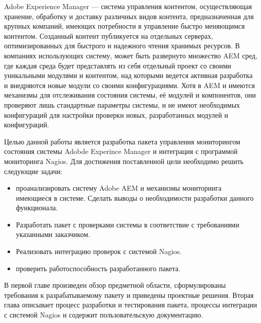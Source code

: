 \Introduction

Adobe Experience Manager — система управления контентом, осуществляющая хранение, обработку и доставку различных видов контента, предназначенная для крупных компаний, имеющих потребности в управление быстро меняющимся контентом. Созданный контент публикуется на отдельных серверах, оптимизированных для быстрого и надежного чтения хранимых ресурсов. В компаниях использующих систему, может быть развернуто множество AEM сред, где каждая среда будет представлять из себя отдельный проект со своими уникальными модулями и контентом, над которыми ведется активная разработка и внедряются новые модули со своими конфигурациями. Хотя в AEM и имеются механизмы для отслеживания состояния системы, её модулей и компонентов, они проверяют лишь стандартные параметры системы, и не имеют необходимых конфигураций для настройки проверки новых, разработанных модулей и конфигураций.

Целью данной работы является разработка пакета управления мониторингом состояния системы Adobde Experince Manager и интеграция с программой мониторинга Nagios. Для достижения поставленной цели необходимо решить следующие задачи:

\begin{itemize}
\item проанализировать систему Adobe AEM и механизмы мониторинга имеющиеся в системе. Сделать выводы о необходимости разработки данного функционала.
\item Разработать пакет с проверками системы в соответствие с требованиями указанными заказчиком.
\item Реализовать интеграцию проверок с системой Nagios.
\item проверить работоспособность разработанного пакета.
\end{itemize}

В первой главе произведен обзор предметной области, сформулированы требования к разрабатываемому пакету и приведены проектные решения. Вторая глава описывает процесс разработки и тестирования пакета, процессы интеграции с системой Nagios и содержит пользовательскую документацию.